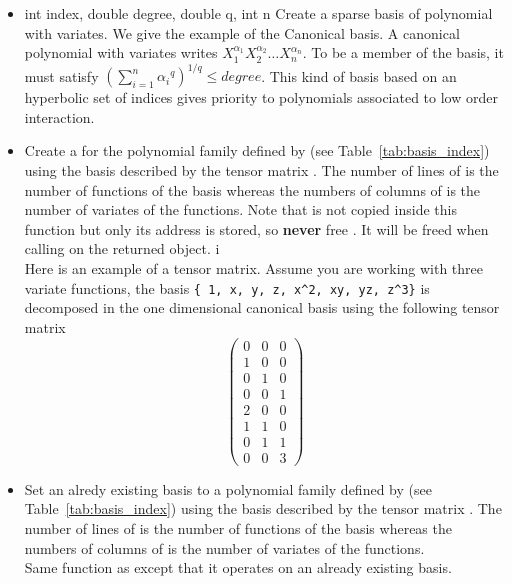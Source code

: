 \begin{itemize}
  \item  {}
    {int index, double degree, double q, int n}
    \sshortdescribe Create a sparse basis of polynomial with 
    variates. We give the example of the Canonical basis. A canonical polynomial
    with  variates writes $X_1^{\alpha_1} X_2^{\alpha_2} \dots
    X_n^{\alpha_n}$. To be a member of the basis, it must satisfy $\left(\sum_{i=1}^n {\alpha_i}^q \right)^{1/q} \leq degree$. This kind of basis based on an hyperbolic set of indices gives priority to polynomials associated to low
    order interaction.

  \item {}
    \sshortdescribe Create a \PnlBasis for the polynomial family
    defined by  (see Table~\ref{tab:basis_index}) using the basis
    described by the tensor matrix . The number of lines of  is
    the number of functions of the basis whereas the numbers of columns of
     is the number of variates of the functions.
    Note that  is not copied inside this function but only its address is
    stored, so {\bf never} free . It will be freed when calling
     on the returned object. i\\
    Here is an example of a tensor matrix. Assume you are working with three
    variate functions, the basis \verb!{ 1, x, y, z, x^2, xy, yz, z^3}! is
    decomposed in the one dimensional canonical basis using the following tensor
    matrix
    \[ \left(
      \begin{array}{ccc}
        0 & 0 & 0 \\
        1 & 0 & 0 \\
        0 & 1 & 0 \\
        0 & 0 & 1 \\
        2 & 0 & 0 \\
        1 & 1 & 0 \\
        0 & 1 & 1\\
        0 & 0 & 3
      \end{array}
    \right) \]

  \item {}
    \sshortdescribe Set an alredy existing basis  to a polynomial family
    defined by  (see Table~\ref{tab:basis_index}) using the basis
    described by the tensor matrix . The number of lines of  is
    the number of functions of the basis whereas the numbers of columns of
     is the number of variates of the functions. \\
    Same function as  except that it
    operates on an already existing basis.

\end{itemize}


